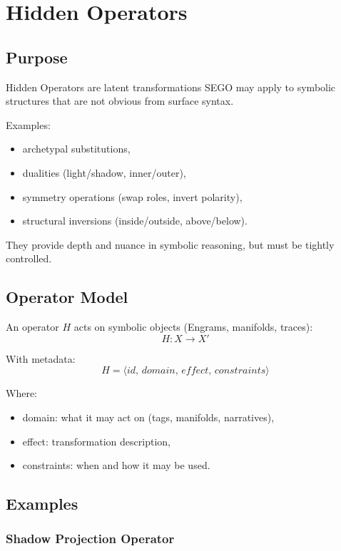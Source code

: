 \chapter{Hidden Operators}
\label{chap:Hidden_Operators}

\section{Purpose}

Hidden Operators are latent transformations SEGO may apply to symbolic
structures that are not obvious from surface syntax.

Examples:
\begin{itemize}
    \item archetypal substitutions,
    \item dualities (light/shadow, inner/outer),
    \item symmetry operations (swap roles, invert polarity),
    \item structural inversions (inside/outside, above/below).
\end{itemize}

They provide depth and nuance in symbolic reasoning, but must be tightly
controlled.

\section{Operator Model}

An operator $H$ acts on symbolic objects (Engrams, manifolds, traces):
\[
H: X \rightarrow X'
\]

With metadata:
\[
H = \langle id,\, domain,\, effect,\, constraints \rangle
\]

Where:
\begin{itemize}
    \item domain: what it may act on (tags, manifolds, narratives),
    \item effect: transformation description,
    \item constraints: when and how it may be used.
\end{itemize}

\section{Examples}

\subsection{Shadow Projection Operator}

